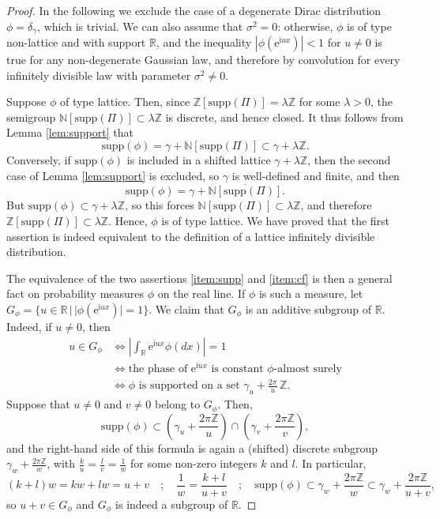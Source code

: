\documentclass[12pt,a4paper,reqno]{amsart}
\theoremstyle{remark}
\newcommand{\N}{\mathbb{N}}
\newcommand{\Z}{\mathbb{Z}}
\newcommand{\R}{\mathbb{R}}
\newcommand{\E}{\mathrm{e}}
\newcommand{\I}{\mathrm{i}}
\newcommand{\supp}{\mathrm{supp}}
\begin{document}
\begin{proof}
In the following we exclude the case of a degenerate Dirac distribution $\phi=\delta_\gamma$, which is trivial. We can also assume that $\sigma^2=0$: otherwise, $\phi$ is of type non-lattice and with support $\R$, and the inequality $|\phi(\E^{\I u x})|<1$ for $u \neq 0$ is true for any non-degenerate Gaussian law, and therefore by convolution for every infinitely divisible law with parameter $\sigma^2\neq 0$.\bigskip

Suppose $\phi$ of type lattice. Then, since $\Z[\supp(\Pi)]=\lambda \Z$ for some $\lambda > 0$, the semigroup $\N[\supp(\Pi)] \subset \lambda \Z$ is discrete, and hence closed.  It thus follows from Lemma \ref{lem:support} that
$$\supp(\phi)=\gamma + \N[\supp(\Pi)]\subset \gamma + \lambda \Z.$$
Conversely, if $\supp(\phi)$ is included in a shifted lattice $\gamma+\lambda \Z$, then the second case of Lemma \ref{lem:support} is excluded, so $\gamma$ is well-defined and finite, and then 
$$\supp(\phi)=\gamma + \overline{\N[\supp(\Pi)]}.$$
But $\supp(\phi) \subset \gamma + \lambda \Z$, so this forces $\N[\supp(\Pi)]\subset \lambda \Z$, and therefore $\Z[\supp(\Pi)]\subset \lambda \Z$. Hence, $\phi$ is of type lattice. We have proved that the first assertion is indeed equivalent to the definition of a lattice infinitely divisible distribution.\bigskip

The equivalence of the two assertions \eqref{item:supp} and \eqref{item:cf} is then a general fact on probability measures $\phi$ on the real line. If $\phi$ is such a measure, let $G_\phi = \{u \in \R\,|\,|\phi(\E^{\I u x})| =1\}$. We claim that $G_\phi$ is an additive subgroup of $\R$. Indeed, if $u \neq 0$, then 
\begin{align*}
u \in G_{\phi} &\iff \left|\int_{\R}\E^{\I u x}\phi(dx)\right| = 1 \\
&\iff \text{the phase of $\E^{\I u x}$ is constant $\phi$-almost surely} \\
&\iff \phi \text{ is supported on a set }\gamma_u + \frac{2\pi}{u}\,\Z.
\end{align*}
Suppose that $u\neq 0$ and $v\neq 0$ belong to $G_\phi$. Then, 
$$\mathrm{supp}(\phi) \subset \left(\gamma_u + \frac{2\pi \Z}{u} \right)\cap \left(\gamma_v + \frac{2\pi \Z}{v} \right),$$
and the right-hand side of this formula is again a (shifted) discrete subgroup $\gamma_w + \frac{2\pi \Z}{w}$, with $\frac{k}{u}=\frac{l}{v}=\frac{1}{w}$ for some non-zero integers $k$ and $l$. In particular,
$$(k+l)w = kw+lw = u+v \quad;\quad \frac{1}{w} = \frac{k+l}{u+v}\quad;\quad \mathrm{supp}(\phi)\subset \gamma_w + \frac{2\pi\Z}{w} \subset \gamma_w + \frac{2\pi\Z}{u+v},$$
so $u+v \in G_\phi$ and $G_\phi$ is indeed a subgroup of $\R$.
\bigskip


\end{proof}
\end{document}
